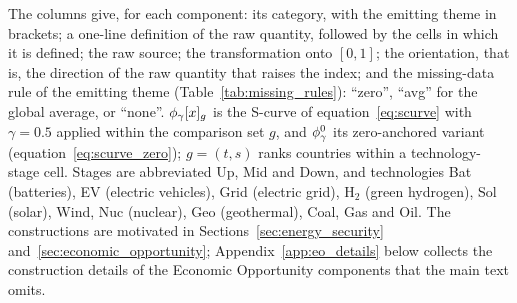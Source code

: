 The columns give, for each component: its category, with the emitting theme in brackets; a
one-line definition of the raw quantity, followed by the cells in which it is defined; the raw
source; the transformation onto $[0,1]$; the orientation, that is, the direction of the raw
quantity that raises the index; and the missing-data rule of the emitting theme
(Table~\ref{tab:missing_rules}): ``zero'', ``avg'' for the global average, or ``none''.
$\phi_{\gamma}[x]_g$ is the S-curve of equation~\eqref{eq:scurve} with $\gamma=0.5$ applied within the
comparison set $g$, and $\phi_{\gamma}^{0}$ its zero-anchored variant (equation~\eqref{eq:scurve_zero});
$g=(t,s)$ ranks countries within a technology-stage cell. Stages are abbreviated Up, Mid and Down,
and technologies Bat (batteries), EV (electric vehicles), Grid (electric grid), H$_2$ (green
hydrogen), Sol (solar), Wind, Nuc (nuclear), Geo (geothermal), Coal, Gas and Oil. The
constructions are motivated in Sections~\ref{sec:energy_security}
and~\ref{sec:economic_opportunity}; Appendix~\ref{app:eo_details} below collects the construction
details of the Economic Opportunity components that the main text omits.

